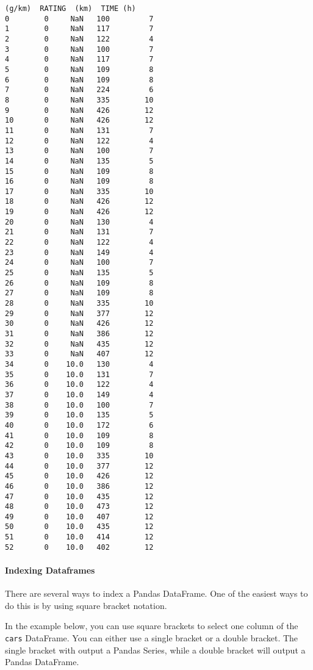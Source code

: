 \documentclass[11pt]{article}
\begin{document}
\begin{Verbatim}[commandchars=\\\{\}]
    (g/km)  RATING  (km)  TIME (h)  
0        0     NaN   100         7  
1        0     NaN   117         7  
2        0     NaN   122         4  
3        0     NaN   100         7  
4        0     NaN   117         7  
5        0     NaN   109         8  
6        0     NaN   109         8  
7        0     NaN   224         6  
8        0     NaN   335        10  
9        0     NaN   426        12  
10       0     NaN   426        12  
11       0     NaN   131         7  
12       0     NaN   122         4  
13       0     NaN   100         7  
14       0     NaN   135         5  
15       0     NaN   109         8  
16       0     NaN   109         8  
17       0     NaN   335        10  
18       0     NaN   426        12  
19       0     NaN   426        12  
20       0     NaN   130         4  
21       0     NaN   131         7  
22       0     NaN   122         4  
23       0     NaN   149         4  
24       0     NaN   100         7  
25       0     NaN   135         5  
26       0     NaN   109         8  
27       0     NaN   109         8  
28       0     NaN   335        10  
29       0     NaN   377        12  
30       0     NaN   426        12  
31       0     NaN   386        12  
32       0     NaN   435        12  
33       0     NaN   407        12  
34       0    10.0   130         4  
35       0    10.0   131         7  
36       0    10.0   122         4  
37       0    10.0   149         4  
38       0    10.0   100         7  
39       0    10.0   135         5  
40       0    10.0   172         6  
41       0    10.0   109         8  
42       0    10.0   109         8  
43       0    10.0   335        10  
44       0    10.0   377        12  
45       0    10.0   426        12  
46       0    10.0   386        12  
47       0    10.0   435        12  
48       0    10.0   473        12  
49       0    10.0   407        12  
50       0    10.0   435        12  
51       0    10.0   414        12  
52       0    10.0   402        12  

    \end{Verbatim}

    \paragraph{Indexing Dataframes}\label{indexing-dataframes}

There are several ways to index a Pandas DataFrame. One of the easiest
ways to do this is by using square bracket notation.

In the example below, you can use square brackets to select one column
of the \texttt{cars} DataFrame. You can either use a single bracket or a
double bracket. The single bracket with output a Pandas Series, while a
double bracket will output a Pandas DataFrame.
\end{document}
